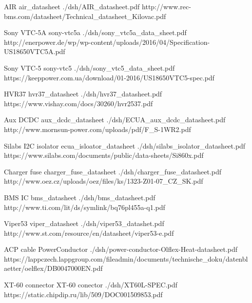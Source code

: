 	{AIR}
	{air_datasheet}
	{./dsh/AIR_datasheet.pdf}
	{http://www.rec-bms.com/datasheet/Technical_datasheet_Kilovac.pdf}

	{Sony VTC-5A}
	{sony-vtc5a}
	{./dsh/sony_vtc5a_data_sheet.pdf}
	{http://enerpower.de/wp/wp-content/uploads/2016/04/Specification-US18650VTC5A.pdf}

	{Sony VTC-5}
	{sony-vtc5}
	{./dsh/sony_vtc5_data_sheet.pdf}
	{https://keeppower.com.ua/download/01-2016/US18650VTC5-spec.pdf}

	{HVR37}
	{hvr37_datasheet}
	{./dsh/hvr37_datasheet.pdf}
	{https://www.vishay.com/docs/30260/hvr2537.pdf}

	{Aux DCDC}
	{aux_dcdc_datasheet}
	{./dsh/ECUA_aux_dcdc_datasheet.pdf}
	{http://www.mornsun-power.com/uploads/pdf/F_S-1WR2.pdf}

	{Silabs I2C isolator}
	{ecua_isloator_datasheet}
	{./dsh/silabs_isolator_datasheet.pdf}
	{https://www.silabs.com/documents/public/data-sheets/Si860x.pdf}

	{Charger fuse}
	{charger_fuse_datasheet}
	{./dsh/charger_fuse_datasheet.pdf}
	{http://www.oez.cz/uploads/oez/files/ks/1323-Z01-07_CZ_SK.pdf}

	{BMS IC}
	{bms_datasheet}
	{./dsh/bms_datasheet.pdf}
	{http://www.ti.com/lit/ds/symlink/bq76pl455a-q1.pdf}

	{Viper53}
	{viper_datasheet}
	{./dsh/viper53_datashet.pdf}
	{http://www.st.com/resource/en/datasheet/viper53-e.pdf}

	{ACP cable}
	{PowerConductor}
	{./dsh/power-conductor-Olflex-Heat-datasheet.pdf}
	{https://lappczech.lappgroup.com/fileadmin/documents/technische_doku/datenblaetter/oelflex/DB0047000EN.pdf}

	{XT-60 connector}
	{XT-60 conector}
	{./dsh/XT60L-SPEC.pdf}
	{https://static.chipdip.ru/lib/509/DOC001509853.pdf}
